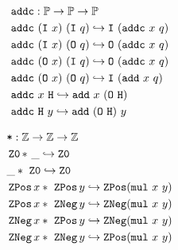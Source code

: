 \begin{definition}
{\begin{align*}
&\tt{addc} : \bb{P} \ra \bb{P} \ra \bb{P} \\
& \tt{addc}~(\tt{I}~x)~(\tt{I}~q) \re \tt{I}~(\tt{addc}~x~q) \\
& \tt{addc}~(\tt{I}~x)~(\tt{O}~q) \re \tt{O}~(\tt{addc}~x~q) \\
& \tt{addc}~(\tt{O}~x)~(\tt{I}~q) \re \tt{O}~(\tt{addc}~x~q) \\
& \tt{addc}~(\tt{O}~x)~(\tt{O}~q) \re \tt{I}~(\tt{add}~x~q) \\
& \tt{addc}~x~\tt{H} \re \tt{add}~x~(\tt{O}~\tt{H}) \\
& \tt{addc}~\tt{H}~y \re \tt{add}~(\tt{O}~\tt{H})~y \\
\end{align*}
\noindent

\begin{align*}
&\tt{*} : \bb{Z} \ra \bb{Z} \ra \bb{Z} \\
& \ZO *~\_ \re \ZO \\
& \_ *~\ZO \re \ZO \\
& \ZPos x *~\ZPos y \re \ZPos (\tt{mul}~x~y) \\
& \ZPos x *~\ZNeg    y \re \ZNeg    (\tt{mul}~x~y) \\
& \ZNeg    x *~\ZPos y \re \ZNeg    (\tt{mul}~x~y) \\
& \ZNeg    x *~\ZNeg    y \re \ZPos (\tt{mul}~x~y) \\
\end{align*}
}%
\end{definition}

